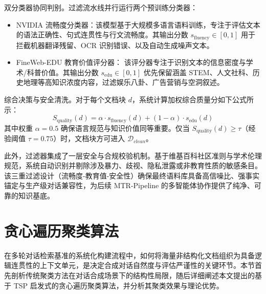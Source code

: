 双分类器协同判别。过滤流水线并行运行两个预训练分类器：

\begin{itemize}

    \item NVIDIA 流畅度分类器：该模型基于大规模多语言语料训练，专注于评估文本的语法正确性、句式连贯性与行文流畅度。其输出分数 $s_{\text{fluency}} \in [0,1]$ 用于拦截机器翻译残留、OCR 识别错误、以及自动生成噪声文本。

    \item FineWeb-EDU 教育价值评分器： 该评分器专注于识别文本的信息密度与学术/科普价值。其输出分数 $s_{\text{edu}} \in [0,1]$ 优先保留涵盖 STEM、人文社科、历史地理等高知识浓度内容，过滤娱乐八卦、广告营销与空洞叙述。

\end{itemize}



综合决策与安全清洗。对于每个文档块 $d$，系统计算加权综合质量分如下公式所示：
\begin{equation}
    S_{\text{quality}}(d) = \alpha \cdot s_{\text{fluency}}(d) + (1-\alpha) \cdot s_{\text{edu}}(d)
\end{equation}
其中权重 $\alpha=0.5$ 确保语言规范与知识价值同等重要。仅当 $S_{\text{quality}}(d) \geq \tau$（经验阈值 $\tau=0.75$）时，文档块方可进入 $\mathcal{D}_{clean}$。



此外，过滤器集成了一层安全与合规校验机制。基于维基百科社区准则与学术伦理规范，系统自动识别并剔除涉及暴力、歧视、隐私泄露或非教育性质的敏感条目。该三重过滤设计（流畅度-教育值-安全性）确保最终语料库具备高信噪比、强事实锚定与生产级对话兼容性，为后续 MTR-Pipeline 的多智能体协作提供了纯净、可靠的知识基底。







\section{贪心遍历聚类算法}

\label{sec:greedy_clustering}



在多轮对话检索基准的系统化构建流程中，如何将海量非结构化文档组织为具备逻辑连贯性的上下文单元，是决定合成对话自然度与评估严谨性的关键环节。本节首先剖析传统聚类方法在对话合成场景下的结构性局限，随后详细阐述本文提出的基于 TSP 启发式的贪心遍历聚类算法，并分析其聚类效果与理论优势。



